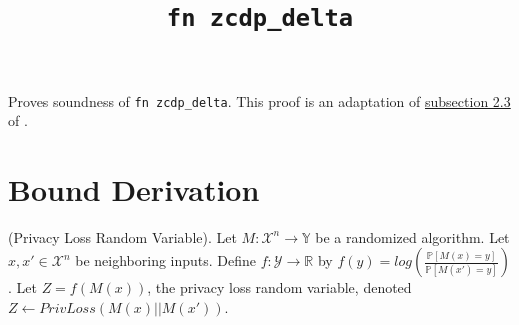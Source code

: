 \documentclass{article}
\title{\texttt{fn zcdp\_delta}}
\author{\MichaelShoemateAuthor}
\begin{document}
\maketitle

Proves soundness of \texttt{fn zcdp\_delta}.
This proof is an adaptation of \href{https://arxiv.org/pdf/2004.00010.pdf#subsection.2.3}{subsection 2.3} of \cite{CKS20}.
\section{Bound Derivation}

\begin{definition}
\label{plrv}
(Privacy Loss Random Variable). 
Let $M: \mathcal{X}^n \rightarrow \mathbb{Y}$ be a randomized algorithm.
Let $x, x' \in \mathcal{X}^n$ be neighboring inputs.
Define $f: \mathcal{Y} \rightarrow \mathbb{R}$ by $f(y) = log \left( \frac{\mathbb{P}[M(x)=y]}{\mathbb{P}[M(x')=y]} \right)$.
Let $Z = f(M(x))$, the privacy loss random variable, denoted $Z \leftarrow PrivLoss(M(x) || M(x'))$.
\end{definition}
\end{document}
